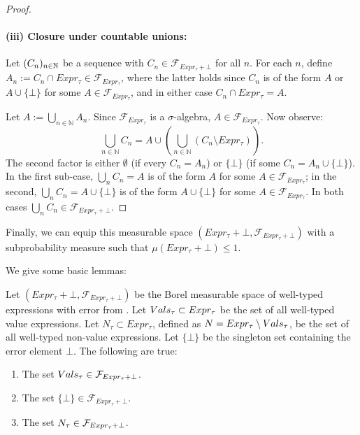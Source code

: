 \begin{proof}
	\paragraph{(iii) Closure under countable unions:}

	Let $(C_n)_{n \in \mathbb{N}}$ be a sequence with $C_n\in\mathcal{F}_{Expr_\tau+\bot}$ for all $n$. For each $n$, define $A_n := C_n \cap Expr_\tau \in \mathcal{F}_{Expr_\tau}$, where the latter holds since $C_n$ is of the form $A$ or $A \cup \{\bot\}$ for some $A \in \mathcal{F}_{Expr_\tau}$, and in either case $C_n \cap Expr_\tau = A$.

	Let $A := \bigcup_{n\in\mathbb{N}} A_n$. Since $\mathcal{F}_{Expr_\tau}$ is a $\sigma$-algebra, $A\in\mathcal{F}_{Expr_\tau}$. Now observe:
	\[
		\bigcup_{n\in\mathbb{N}} C_n = A \cup \left(\bigcup_{n\in\mathbb{N}} (C_n\setminus Expr_\tau)\right).
	\]
	The second factor is either $\emptyset$ (if every $C_n = A_n$) or $\{\bot\}$ (if some $C_n = A_n \cup \{\bot\}$). In the first sub-case, $\bigcup_n C_n = A$ is of the form $A$ for some $A \in \mathcal{F}_{Expr_{\tau}}$; in the second, $\bigcup_n C_n = A\cup\{\bot\}$ is of the form $A \cup \{\bot\}$ for some $A \in \mathcal{F}_{Expr_{\tau}}$. In both cases $\bigcup_n C_n \in \mathcal{F}_{Expr_\tau+\bot}$.
\end{proof}


Finally, we can equip this measurable space $(Expr_{\tau} + \bot, \mathcal{F}_{Expr_{\tau} + \bot})$ with a subprobability measure such that $\mu(Expr_{\tau} + \bot) \leq 1$. 

We give some basic lemmas:

\begin{lemma}\label{lem:measurable-subsets}
	Let $(Expr_{\tau} + \bot, \mathcal{F}_{Expr_{\tau} + \bot})$ be the Borel measurable space of well-typed expressions with error from . Let $Vals_{\tau} \subset Expr_{\tau}$ be the set of all well-typed value expressions. Let $N_{\tau} \subset Expr_{\tau}$, defined as $N = Expr_{\tau} \setminus Vals_{\tau}$, be the set of all well-typed non-value expressions. Let $\{\bot\}$ be the singleton set containing the error element $\bot$. The following are true:
	\begin{enumerate}
		\item\label{lem:measurable-vals} The set $Vals_{\tau} \in \mathcal{F}_{Expr_{\tau} + \bot}$.
		\item\label{lem:measurable-error} The set $\{\bot\} \in \mathcal{F}_{Expr_{\tau} + \bot}$.
		\item\label{lem:measurable-nonvals} The set $N_{\tau} \in \mathcal{F}_{Expr_{\tau} + \bot}$.
	\end{enumerate}
\end{lemma}

